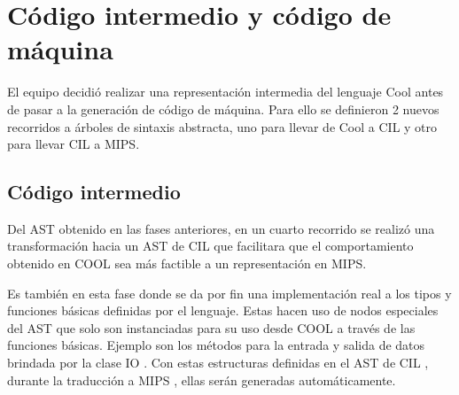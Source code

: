 \documentclass[a4paper,10pt,twocolumn]{article}
\begin{document}
\section{Código intermedio y código de máquina}

El equipo decidió realizar una representación intermedia del lenguaje Cool antes de pasar a la generación de código de máquina. Para ello se definieron 2 nuevos recorridos a árboles de sintaxis abstracta, uno para llevar de Cool a CIL y otro para llevar CIL a MIPS.

\subsection{Código intermedio}
	
 Del AST obtenido en las fases anteriores, en un cuarto recorrido se realizó una transformación hacia un AST de  CIL  que facilitara que el comportamiento obtenido en  COOL  sea más factible a un representación en MIPS.


 Es también en esta fase donde se da por fin una implementación real a los tipos y
 funciones básicas definidas por el lenguaje. Estas hacen uso de nodos especiales
 del AST que solo son instanciadas para su uso desde  COOL a través de las funciones
 básicas. Ejemplo son los métodos para la entrada y salida de datos brindada por la
 clase  IO . Con estas estructuras definidas en el AST de  CIL , durante la traducción a
 MIPS , ellas serán generadas automáticamente.
 
\end{document}
